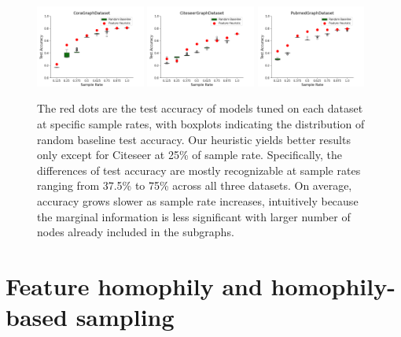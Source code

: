 \begin{figure}[t]
\centering
\includegraphics[width=0.32\textwidth]{img/GNN_acc_revised/CoraGraphDataset_undirected_random_baseline_boxplot.png}
\includegraphics[width=0.32\textwidth]{img/GNN_acc_revised/CiteseerGraphDataset_undirected_random_baseline_boxplot.png}
\includegraphics[width=0.32\textwidth]{img/GNN_acc_revised/PubmedGraphDataset_undirected_random_baseline_boxplot.png}
\caption{The red dots are the test accuracy of models tuned on each dataset at specific sample rates, with boxplots indicating the distribution of random baseline test accuracy. Our heuristic yields better results only except for Citeseer at 25\% of sample rate. Specifically, the differences of test accuracy are mostly recognizable at sample rates ranging from 37.5\% to 75\% across all three datasets. On average, accuracy grows slower as sample rate increases, intuitively because the marginal information is less significant with larger number of nodes already included in the subgraphs. }
\label{fig:GNN Acc}
\end{figure}

\section{Feature homophily and homophily-based sampling}

